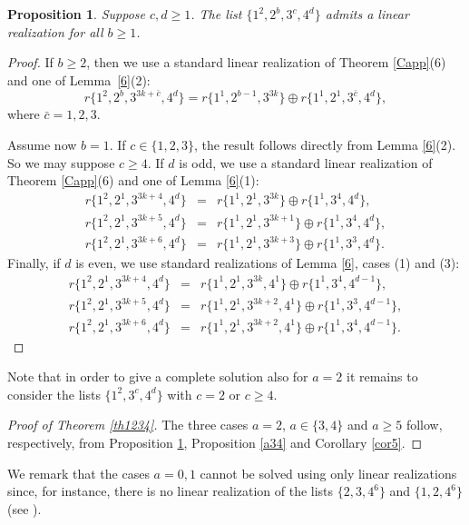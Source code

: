 \documentclass{amsart}
\newtheorem{prop}{Proposition}[section]
\theoremstyle{definition}
\numberwithin{equation}{section}
\def\ol{\oplus}
\begin{document}
\begin{prop}\label{a2}
Suppose $c,d\geq 1$.
The list $\{1^2, 2^b, 3^c, 4^d\}$ admits a  linear realization for all $b\geq 1$.
\end{prop}

\begin{proof}
If $b\geq 2$, then we use a standard linear realization of Theorem \ref{Capp}(6) and one of Lemma~\ref{6}(2):
$$r\{1^2, 2^b, 3^{3k+\bar c} , 4^d\}=r\{1^1, 2^{b-1}, 3^{3k}\} \ol r\{1^1,2^1,3^{\bar c}, 4^d\},$$
where $\bar c=1,2,3$.

Assume now $b=1$. If $c\in \{1,2,3\}$, the result follows directly from Lemma \ref{6}(2).
So we may suppose $c\geq 4$.
If $d$ is odd, we use  a standard linear realization of Theorem \ref{Capp}(6) and one of Lemma \ref{6}(1):
$$\begin{array}{rcl}
r\{1^2,2^1, 3^{3k+4}, 4^d\} & = & r\{1^1,2^1, 3^{3k}\} \ol r\{1^1, 3^4, 4^{d}\},\\
r\{1^2,2^1, 3^{3k+5}, 4^d\} & = & r\{1^1,2^1, 3^{3k+1}\} \ol r\{1^1, 3^4, 4^{d}\},\\
r\{1^2,2^1, 3^{3k+6}, 4^d\} & = & r\{1^1,2^1, 3^{3k+3}\} \ol r\{1^1, 3^3, 4^{d}\}.
  \end{array}$$
Finally, if $d$ is even,
we use standard  realizations of Lemma \ref{6}, cases (1) and (3):
$$\begin{array}{rcl}
r\{1^2,2^1, 3^{3k+4}, 4^d\} & = & r\{1^1,2^1, 3^{3k},4^1\} \ol r\{1^1, 3^4, 4^{d-1}\},\\
r\{1^2,2^1, 3^{3k+5}, 4^d\} & = & r\{1^1,2^1, 3^{3k+2},4^1\} \ol r\{1^1, 3^3, 4^{d-1}\},\\
r\{1^2,2^1, 3^{3k+6}, 4^d\} & = & r\{1^1,2^1, 3^{3k+2},4^1\} \ol r\{1^1, 3^4, 4^{d-1}\}.
  \end{array}$$
\end{proof}

Note that in order to give a complete solution also for $a=2$ it remains to consider the lists
$\{1^2, 3^c, 4^d\}$ with $c=2$ or $c\geq 4$.


\begin{proof}[Proof of Theorem \rm{\ref{th1234}}]
The three cases $a=2$, $a\in \{3,4\}$ and $a\geq 5$ follow, respectively, from
Proposition \ref{a2}, Proposition \ref{a34} and Corollary \ref{cor5}.
\end{proof}

We remark that the cases $a=0,1$ cannot be solved using only linear realizations since,
for instance, there is no linear realization of the lists $\{2,3,4^6\}$ and $\{1,2,4^6\}$ (see \cite[Lemma 13]{PPnew}). 
\end{document}
